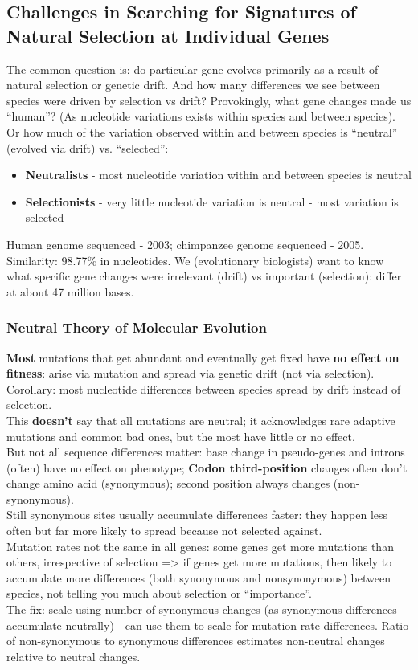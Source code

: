 \documentclass{scrartcl}
\begin{document}
\subsection{Challenges in Searching for Signatures of Natural Selection at Individual Genes}
\label{sec:08-05}
The common question is: do particular gene evolves primarily as a result of natural selection or genetic drift.
And how many differences we see between species were driven by selection vs drift?
Provokingly, what gene changes made us ``human''?
(As nucleotide variations exists within species and between species).
Or how much of the variation observed within and between species is ``neutral'' (evolved via drift) vs. ``selected'':
\begin{itemize}
\item {\bf Neutralists} - most nucleotide variation within and between species is neutral
\item {\bf Selectionists} - very little nucleotide variation is neutral - most variation is selected
\end{itemize}
Human genome sequenced - 2003; chimpanzee genome sequenced - 2005.
Similarity: 98.77\% in nucleotides.
We (evolutionary biologists) want to know what specific gene changes were irrelevant (drift) vs important (selection): differ at about 47 million bases.

\subsubsection{Neutral Theory of Molecular Evolution}
\label{sec:08-05}
{\bf Most} mutations that get abundant and eventually get fixed have {\bf no effect on fitness}: arise via mutation and spread via genetic drift (not via selection).\\
Corollary: most nucleotide differences between species spread by drift instead of selection.\\
This {\bf doesn't} say that all mutations are neutral; it acknowledges rare adaptive mutations and common bad ones, but the most have little or no effect.\\
But not all sequence differences matter: base change in pseudo-genes and introns (often) have no effect on phenotype; {\bf Codon third-position} changes often don't change amino acid (synonymous); second position always changes (non-synonymous).\\
Still synonymous sites usually accumulate differences faster: they happen less often but far more likely to spread because not selected against.\\
Mutation rates not the same in all genes: some genes get more mutations than others, irrespective of selection => if genes get more mutations, then likely to accumulate more differences (both synonymous and nonsynonymous) between species, not telling you much about selection or ``importance''.\\
The fix: scale using number of synonymous changes (as synonymous differences accumulate neutrally) - can use them to scale for mutation rate differences.
Ratio of non-synonymous to synonymous differences estimates non-neutral changes relative to neutral changes.
\end{document}
